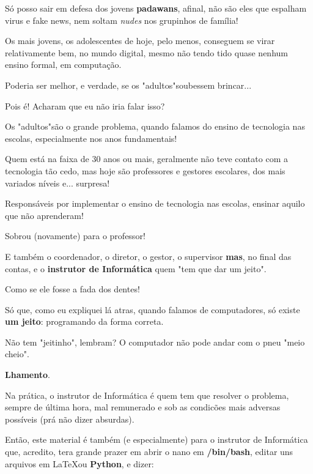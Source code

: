 \begin{multicols}{2}
Só posso sair em defesa dos jovens \textbf{padawans}, afinal, não são eles que espalham virus e fake news, nem soltam \textit{nudes} nos grupinhos de família! 


%

Os mais jovens, os adolescentes de hoje, pelo menos, conseguem se virar relativamente bem, no mundo digital, mesmo não tendo tido quase nenhum ensino formal, em computação.

Poderia ser melhor, e verdade, se os "adultos"\space soubessem brincar...

Pois é! Acharam que eu não iria falar isso?

Os "adultos"\space são o grande problema, quando falamos do ensino de tecnologia nas escolas, especialmente nos anos fundamentais!

Quem está na faixa de 30 anos ou mais, geralmente não teve contato com a tecnologia tão cedo, mas hoje são professores e gestores escolares, dos mais variados níveis e... surpresa!

Responsáveis por implementar o ensino de tecnologia nas escolas, ensinar aquilo que não aprenderam!

Sobrou (novamente) para o professor!

E também o coordenador, o diretor, o gestor, o supervisor \textbf{mas}, no final das contas, e o \textbf{instrutor de Informática} quem "tem que dar um jeito".

Como se ele fosse a fada dos dentes!

Só que, como eu expliquei lá atras, quando falamos de computadores, só existe \textbf{um jeito}: programando da forma correta.

Não tem "jeitinho", lembram? O computador não pode andar com o pneu "meio cheio".

\textbf{Lhamento}.

Na prática, o instrutor de Informática é quem tem que resolver o problema, sempre de última hora, mal remunerado e sob as condicões mais adversas possíveis (prá não dizer absurdas).

Então, este material é também (e especialmente) para o instrutor de Informática que, acredito, tera grande prazer em abrir o nano em \textbf{/bin/bash}, editar uns arquivos em \LaTeX ou \textbf{Python}, e dizer:


\end{multicols}

